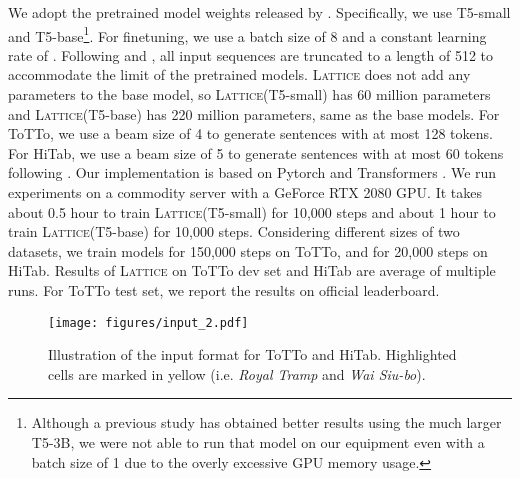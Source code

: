 \documentclass[11pt]{article}
\newcommand{\stitle}[1]{\vspace{1ex} \noindent{\bf #1.}}
\newcommand{\model}{\mbox{\textsc{Lattice}}\xspace}
\begin{document}
\stitle{Implementation Details}
We adopt the pretrained model weights released by \citet{raffel2020exploring}.
Specifically, we use T5-small and T5-base\footnote{Although a previous study \citep{kale2020text} has obtained better results using the much larger T5-3B, we were not able to run that model on our equipment even with a batch size of 1 due to the overly excessive GPU memory usage.}.
For finetuning, we use a batch size of 8 and a constant learning rate of .
Following \citet{kale2020text} and \citet{cheng2021hitab}, all input sequences are truncated to a length of 512 to accommodate the limit of the pretrained models.
\model does not add any parameters to the base model, so \model (T5-small) has 60 million parameters and \model (T5-base) has 220 million parameters, same as the base models.
For ToTTo, we use a beam size of 4 to generate sentences with at most 128 tokens.
For HiTab, we use a beam size of 5 to generate sentences with at most 60 tokens following \citet{cheng2021hitab}.
Our implementation is based on Pytorch \citep{paszke2019pytorch} and Transformers \citep{wolf2020transformers}.
We run experiments on a commodity server with a GeForce RTX 2080 GPU.
It takes about 0.5 hour to train \model (T5-small) for 10,000 steps and about 1 hour to train \model (T5-base) for 10,000 steps.
Considering different sizes of two datasets, we train models for 150,000 steps on ToTTo, and for 20,000 steps on HiTab.
Results of \model on ToTTo dev set and HiTab are average of multiple runs.
For ToTTo test set, we report the results on official leaderboard.



\begin{figure}[t]
  \begin{center}
    \texttt{[image: figures/input\_2.pdf]}
  \end{center}
  \caption{Illustration of the input format for ToTTo and HiTab. Highlighted cells are marked in yellow (i.e. \textit{Royal Tramp} and \textit{Wai Siu-bo}).
    }
  \label{fig/input}
\end{figure}
\end{document}
